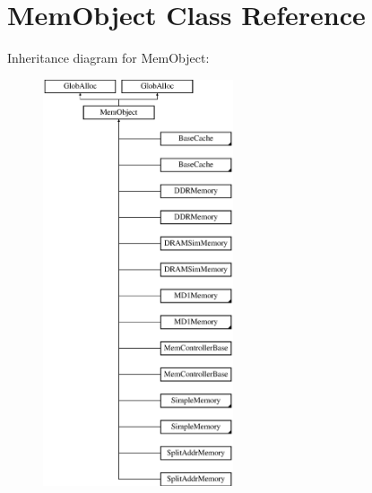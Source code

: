 \hypertarget{classMemObject}{\section{Mem\-Object Class Reference}
\label{classMemObject}
}
Inheritance diagram for Mem\-Object\-:\begin{figure}[H]
\begin{center}
\leavevmode
\includegraphics[height=12.000000cm]{classMemObject}
\end{center}
\end{figure}

